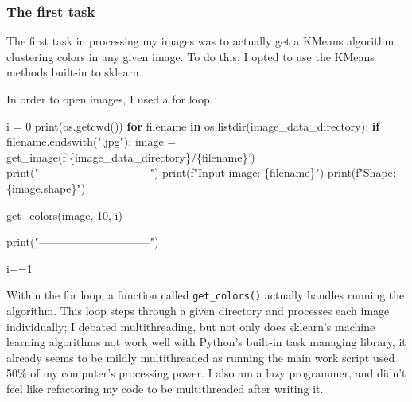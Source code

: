 \documentclass[11pt]{article}
\newenvironment{Shaded}{}{}
\newcommand{\KeywordTok}[1]{\textcolor[rgb]{0.00,0.44,0.13}{\textbf{{#1}}}}
\newcommand{\DecValTok}[1]{\textcolor[rgb]{0.25,0.63,0.44}{{#1}}}
\newcommand{\StringTok}[1]{\textcolor[rgb]{0.25,0.44,0.63}{{#1}}}
\newcommand{\NormalTok}[1]{{#1}}
\newcommand{\SpecialCharTok}[1]{\textcolor[rgb]{0.25,0.44,0.63}{{#1}}}
\newcommand{\SpecialStringTok}[1]{\textcolor[rgb]{0.73,0.40,0.53}{{#1}}}
\newcommand{\ControlFlowTok}[1]{\textcolor[rgb]{0.00,0.44,0.13}{\textbf{{#1}}}}
\newcommand{\OperatorTok}[1]{\textcolor[rgb]{0.40,0.40,0.40}{{#1}}}
\newcommand{\BuiltInTok}[1]{{#1}}
\begin{document}
    \hypertarget{the-first-task}{%
\subsubsection{The first task}\label{the-first-task}}

The first task in processing my images was to actually get a KMeans
algorithm clustering colors in any given image. To do this, I opted to
use the KMeans methods built-in to sklearn.

In order to open images, I used a for loop.

\begin{Shaded}
\begin{Highlighting}[]
\NormalTok{ i }\OperatorTok{=} \DecValTok{0}
    \BuiltInTok{print}\NormalTok{(os.getcwd())}
    \ControlFlowTok{for}\NormalTok{ filename }\KeywordTok{in}\NormalTok{ os.listdir(image_data_directory):}
        \ControlFlowTok{if}\NormalTok{ filename.endswith(}\StringTok{".jpg"}\NormalTok{):}
\NormalTok{            image }\OperatorTok{=}\NormalTok{ get_image(}\SpecialStringTok{f'}\SpecialCharTok{\{}\NormalTok{image_data_directory}\SpecialCharTok{\}}\SpecialStringTok{/}\SpecialCharTok{\{}\NormalTok{filename}\SpecialCharTok{\}}\SpecialStringTok{'}\NormalTok{)}
            \BuiltInTok{print}\NormalTok{(}\StringTok{"------------------------------"}\NormalTok{)}
            \BuiltInTok{print}\NormalTok{(}\SpecialStringTok{f"Input image: }\SpecialCharTok{\{}\NormalTok{filename}\SpecialCharTok{\}}\SpecialStringTok{"}\NormalTok{)}
            \BuiltInTok{print}\NormalTok{(}\SpecialStringTok{f"Shape: }\SpecialCharTok{\{}\NormalTok{image}\SpecialCharTok{.}\NormalTok{shape}\SpecialCharTok{\}}\SpecialStringTok{"}\NormalTok{)}
        
\NormalTok{            get_colors(image, }\DecValTok{10}\NormalTok{, i)}

            \BuiltInTok{print}\NormalTok{(}\StringTok{"------------------------------"}\NormalTok{)}

\NormalTok{            i}\OperatorTok{+=}\DecValTok{1}
\end{Highlighting}
\end{Shaded}

Within the for loop, a function called \texttt{get\_colors()} actually
handles running the algorithm. This loop steps through a given directory
and processes each image individually; I debated multithreading, but not
only does sklearn's machine learning algorithms not work well with
Python's built-in task managing library, it already seems to be mildly
multithreaded as running the main work script used 50\% of my computer's
processing power. I also am a lazy programmer, and didn't feel like
refactoring my code to be multithreaded after writing it.
\end{document}
